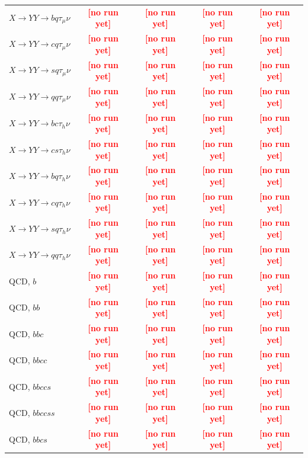 \documentclass[12pt]{article}   %
\newcommand{\pending}[1]{\textcolor{red}{\textbf{[#1]}}}
\begin{document}
\begin{landscape}
{\begin{longtable}{@{\extracolsep{\fill}}lcccc@{}}
$X\to YY\to bq\tau_\mu\nu$ & \pending{no run yet} & \pending{no run yet} & \pending{no run yet} & \pending{no run yet} \\
$X\to YY\to cq\tau_\mu\nu$ & \pending{no run yet} & \pending{no run yet} & \pending{no run yet} & \pending{no run yet} \\
$X\to YY\to sq\tau_\mu\nu$ & \pending{no run yet} & \pending{no run yet} & \pending{no run yet} & \pending{no run yet} \\
$X\to YY\to qq\tau_\mu\nu$ & \pending{no run yet} & \pending{no run yet} & \pending{no run yet} & \pending{no run yet} \\
\midrule
$X\to YY\to bc\tau_h\nu$ & \pending{no run yet} & \pending{no run yet} & \pending{no run yet} & \pending{no run yet} \\
$X\to YY\to cs\tau_h\nu$ & \pending{no run yet} & \pending{no run yet} & \pending{no run yet} & \pending{no run yet} \\
$X\to YY\to bq\tau_h\nu$ & \pending{no run yet} & \pending{no run yet} & \pending{no run yet} & \pending{no run yet} \\
$X\to YY\to cq\tau_h\nu$ & \pending{no run yet} & \pending{no run yet} & \pending{no run yet} & \pending{no run yet} \\
$X\to YY\to sq\tau_h\nu$ & \pending{no run yet} & \pending{no run yet} & \pending{no run yet} & \pending{no run yet} \\
$X\to YY\to qq\tau_h\nu$ & \pending{no run yet} & \pending{no run yet} & \pending{no run yet} & \pending{no run yet} \\
\midrule
QCD, $b$ & \pending{no run yet} & \pending{no run yet} & \pending{no run yet} & \pending{no run yet} \\
QCD, $bb$ & \pending{no run yet} & \pending{no run yet} & \pending{no run yet} & \pending{no run yet} \\
QCD, $bbc$ & \pending{no run yet} & \pending{no run yet} & \pending{no run yet} & \pending{no run yet} \\
QCD, $bbcc$ & \pending{no run yet} & \pending{no run yet} & \pending{no run yet} & \pending{no run yet} \\
QCD, $bbccs$ & \pending{no run yet} & \pending{no run yet} & \pending{no run yet} & \pending{no run yet} \\
QCD, $bbccss$ & \pending{no run yet} & \pending{no run yet} & \pending{no run yet} & \pending{no run yet} \\
QCD, $bbcs$ & \pending{no run yet} & \pending{no run yet} & \pending{no run yet} & \pending{no run yet} \\

\end{longtable}}
\end{landscape}
\end{document}
